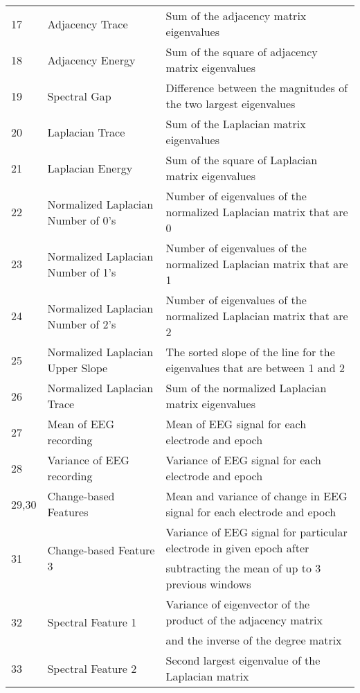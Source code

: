 \documentclass{article} %
\theoremstyle{definition}
\theoremstyle{remark}
\begin{document}
\begin{table}[htb]
\begin{tabular}{lll}
17&Adjacency Trace & Sum of the adjacency matrix eigenvalues\\
18&Adjacency Energy & Sum of the square of adjacency matrix eigenvalues\\
19&Spectral Gap &  Difference between the magnitudes of the two largest eigenvalues\\
20 &Laplacian Trace & Sum of the Laplacian matrix eigenvalues\\
21&Laplacian Energy &  Sum of the square of Laplacian matrix eigenvalues\\
22&Normalized Laplacian Number of 0's & Number of eigenvalues of the normalized Laplacian matrix that are 0\\
23&Normalized Laplacian Number of 1's&  Number of eigenvalues of the normalized Laplacian matrix that are 1\\
24&Normalized Laplacian Number of 2's& Number of eigenvalues of the normalized Laplacian matrix that are 2\\ 
25&Normalized Laplacian Upper Slope& The sorted slope of the line for the eigenvalues that are between 1 and 2\\
26&Normalized Laplacian Trace& Sum of the normalized Laplacian matrix eigenvalues\\
27&Mean of EEG recording&Mean of EEG signal for each electrode and epoch\\
28&Variance of EEG recording&Variance of EEG signal for each electrode and epoch\\
29,30&Change-based Features&Mean and variance of change in EEG signal for each electrode and epoch\\
\multirow{2}{*}{31}&\multirow{2}{*}{Change-based Feature 3}&Variance of EEG signal for particular electrode in given epoch after\\
&&subtracting the mean of up to 3 previous windows \\
\multirow{2}{*}{32}&\multirow{2}{*}{Spectral Feature 1}&Variance of eigenvector of the product of the adjacency matrix
\\&& and the inverse of the degree matrix\\
33&Spectral Feature 2&Second largest eigenvalue of the Laplacian matrix\\
\hline
\end{tabular}
\end{table}
\end{document}
